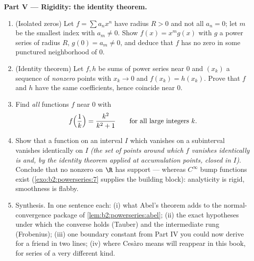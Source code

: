 \begin{problem}
\medskip
\noindent\textbf{Part V --- Rigidity: the identity theorem.}
\begin{enumerate}[resume]
  \item (Isolated zeros) Let $f = \sum a_nx^n$ have radius $R >
        0$ and not all $a_n = 0$; let $m$ be the smallest index
        with $a_m \neq 0$. Show $f(x) = x^m g(x)$ with $g$ a
        power series of radius $R$, $g(0) = a_m \neq 0$, and
        deduce that $f$ has no zero in some punctured
        neighborhood of $0$.
  \item (Identity theorem) Let $f, h$ be sums of power series
        near $0$ and $(x_k)$ a sequence of \emph{nonzero}
        points with $x_k \to 0$ and $f(x_k) = h(x_k)$. Prove
        that $f$ and $h$ have the same coefficients, hence
        coincide near $0$.
  \item Find \emph{all} functions $f$  near $0$ with
        \[
        f\Bigl(\frac1k\Bigr) = \frac{k^2}{k^2+1}
        \qquad\text{for all large integers } k .
        \]
  \item Show that a function  on an  interval $I$
        which vanishes on a subinterval vanishes identically on
        $I$ \emph{(the set of points around which $f$ vanishes
        identically is  and, by the identity theorem
        applied at accumulation points, closed in $I$)}.
        Conclude that no nonzero  on $\R$ has
         support --- whereas $C^\infty$ bump functions
        exist (\cref{exo:b2:powerseries:7} supplies the
        building block): analyticity is rigid, smoothness is
        flabby.
  \item Synthesis. In one sentence each: (i) what Abel's
        theorem adds to the normal-convergence package of
        \cref{lem:b2:powerseries:abel}; (ii) the exact
        hypotheses under which the converse holds (Tauber) and
        the intermediate rung (Frobenius); (iii) one boundary
        constant from Part IV you could now derive for a
        friend in two lines; (iv) where Ces\`aro means will
        reappear in this book, for series of a very different
        kind.
\end{enumerate}
\end{problem}
